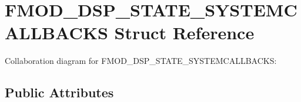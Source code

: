 \hypertarget{struct_f_m_o_d___d_s_p___s_t_a_t_e___s_y_s_t_e_m_c_a_l_l_b_a_c_k_s}{\section{F\+M\+O\+D\+\_\+\+D\+S\+P\+\_\+\+S\+T\+A\+T\+E\+\_\+\+S\+Y\+S\+T\+E\+M\+C\+A\+L\+L\+B\+A\+C\+K\+S Struct Reference}
\label{struct_f_m_o_d___d_s_p___s_t_a_t_e___s_y_s_t_e_m_c_a_l_l_b_a_c_k_s}
}


Collaboration diagram for F\+M\+O\+D\+\_\+\+D\+S\+P\+\_\+\+S\+T\+A\+T\+E\+\_\+\+S\+Y\+S\+T\+E\+M\+C\+A\+L\+L\+B\+A\+C\+K\+S\+:
\subsection*{Public Attributes}
